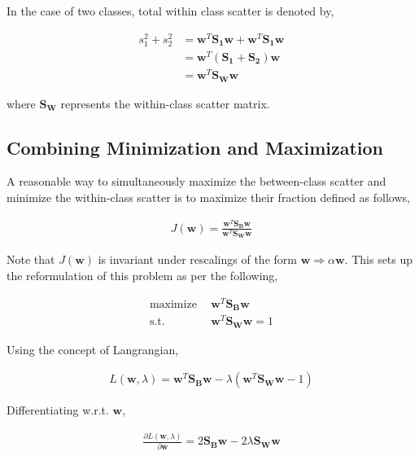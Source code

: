\documentclass[11pt, a4paper]{article}
\begin{document}
In the case of two classes, total within class scatter is denoted by,

\begin{align*}
	s_1^2 + s_2^2 & = \boldsymbol{w}^T \boldsymbol{S_1} \boldsymbol{w} + \boldsymbol{w}^T \boldsymbol{S_1} \boldsymbol{w} \\
	              & = \boldsymbol{w}^T (\boldsymbol{S_1}+\boldsymbol{S_2}) \boldsymbol{w}                                 \\
	              & = \boldsymbol{w}^T \boldsymbol{S_W} \boldsymbol{w}                                                    
\end{align*}

where $\boldsymbol{S_W}$ represents the within-class scatter matrix.

\subsection{Combining Minimization and Maximization}

A reasonable way to simultaneously maximize the between-class scatter and minimize the within-class scatter is to maximize their fraction defined as follows,

\begin{align*}
	J(\boldsymbol{w}) = \frac{\boldsymbol{w}^T \boldsymbol{S_B} \boldsymbol{w}}{\boldsymbol{w}^T \boldsymbol{S_W} \boldsymbol{w}} 
\end{align*}

Note that $J(\boldsymbol{w})$ is invariant under rescalings of the form $\boldsymbol{w} \Rightarrow \alpha \boldsymbol{w}$. This sets up the reformulation of this problem as per the following,

\begin{align*}
	\text{maximize} & \ \ \boldsymbol{w}^T \boldsymbol{S_B} \boldsymbol{w}     \\
	\text{s.t.}     & \ \ \boldsymbol{w}^T \boldsymbol{S_W} \boldsymbol{w} = 1 
\end{align*}

Using the concept of Langrangian, 

\begin{align*}
	L(\boldsymbol{w}, \lambda) = \boldsymbol{w}^T \boldsymbol{S_B} \boldsymbol{w} - \lambda(\boldsymbol{w}^T \boldsymbol{S_W} \boldsymbol{w} - 1) 
\end{align*}

Differentiating w.r.t. $\boldsymbol{w}$,

\begin{align*}
	\frac{\partial L(\boldsymbol{w}, \lambda)}{\partial \boldsymbol{w}} = 2\boldsymbol{S_B}\boldsymbol{w} - 2\lambda \boldsymbol{S_W}\boldsymbol{w} 
\end{align*}
\end{document}
